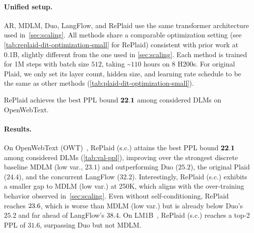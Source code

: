 \documentclass{article}
\begin{document}
\paragraph{Unified setup.} AR, MDLM, Duo, LangFlow, and RePlaid use the same transformer architecture used in~\cref{sec:scaling}. All methods share a comparable optimization setting (see \cref{tab:replaid-dit-optimization-small} for RePlaid) consistent with prior work at 0.1B, slightly different from the one used in \cref{sec:scaling}. Each method is trained for 1M steps with batch size $512$, taking \textasciitilde$110$ hours on 8 H200s. For original Plaid, we only set its layer count, hidden size, and learning rate schedule to be the same as other methods (\cref{tab:plaid-dit-optimization-small}). 

\begin{findingbox}
    RePlaid achieves the best PPL bound $\mathbf{22.1}$ among considered DLMs on OpenWebText.
\end{findingbox}

\paragraph{Results.} On OpenWebText (OWT)~\citep{Gokaslan2019OpenWeb}, RePlaid (s.c.) attains the best PPL bound $\mathbf{22.1}$ among considered DLMs (\cref{tab:val-ppl}), improving over the strongest discrete baseline MDLM (low var., $23.1$) and outperforming Duo ($25.2$), the original Plaid ($24.4$), and the concurrent LangFlow ($32.2$). Interestingly, RePlaid (s.c.) exhibits a smaller gap to MDLM (low var.) at 250K, which aligns with the over-training behavior observed in~\cref{sec:scaling}. Even without self-conditioning, RePlaid reaches $23.6$, which is worse than MDLM (low var.) but is already below Duo's $25.2$ and far ahead of LangFlow's $38.4$. On LM1B~\citep{chelba2014billion}, RePlaid (s.c.) reaches a top-2 PPL of $31.6$, surpassing Duo but not MDLM. 

%
%
%
%
%
%
%
%
%
%
%
%
%
%
%
%
%
%

%
\begin{table}
    
    \centering
    \caption{\small OWT ablations for 1M steps.}
    \label{tab:replaid-ablations}
    \vspace{-0.5em}
\end{table}
\end{document}
